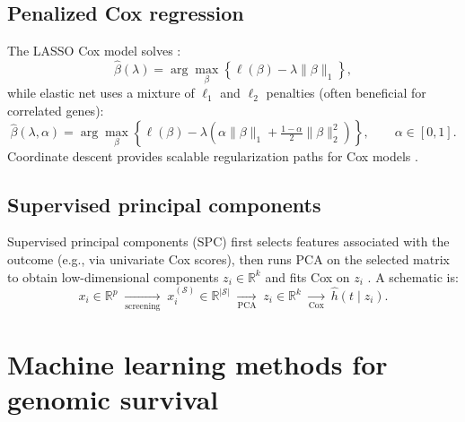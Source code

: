 \documentclass[11pt]{article}
\begin{document}
\subsection{Penalized Cox regression}\label{sec:lasso-cox}
The LASSO Cox model solves \citep{Tibshirani1997}:
\begin{equation}
\hat\beta(\lambda)
=
\arg\max_{\beta}\left\{\ell(\beta) - \lambda \|\beta\|_1\right\},
\label{eq:lasso_cox}
\end{equation}
while elastic net uses a mixture of $\ell_1$ and $\ell_2$ penalties (often beneficial for correlated genes):
\begin{equation}
\hat\beta(\lambda,\alpha)
=
\arg\max_{\beta}\left\{\ell(\beta) - \lambda\left(\alpha\|\beta\|_1 + \tfrac{1-\alpha}{2}\|\beta\|_2^2\right)\right\},
\qquad \alpha\in[0,1].
\label{eq:enet_cox}
\end{equation}
Coordinate descent provides scalable regularization paths for Cox models \citep{Simon2011}.

\subsection{Supervised principal components}
Supervised principal components (SPC) first selects features associated with the outcome (e.g., via univariate Cox scores), then runs PCA on the selected matrix to obtain low-dimensional components $z_i\in\mathbb{R}^k$ and fits Cox on $z_i$ \citep{Bair2006}. A schematic is:
\[
x_i \in \mathbb{R}^p
\;\xrightarrow[\text{screening}]{}
\;x_i^{(\mathcal{S})} \in \mathbb{R}^{|\mathcal{S}|}
\;\xrightarrow[\text{PCA}]{}
\; z_i \in \mathbb{R}^k
\;\xrightarrow[\text{Cox}]{}
\;\hat h(t\mid z_i).
\]

\section{Machine learning methods for genomic survival}\label{sec:ml}
\end{document}
